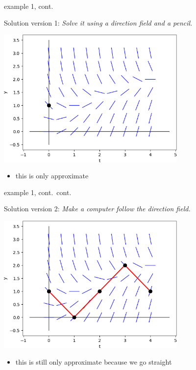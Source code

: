 \documentclass{beamer}
\begin{document}
\begin{frame}{example 1, cont.}

Solution version 1: \emph{Solve it using a direction field and a pencil.}

\bigskip
\hfill \includegraphics[width=0.7\textwidth]{figs/sequence-1}

\begin{itemize}
\item this is only approximate
\end{itemize}
\end{frame}


\begin{frame}{example 1, cont.~cont.}

Solution version 2: \emph{Make a computer follow the direction field.}

\bigskip
\hfill \includegraphics[width=0.7\textwidth]{figs/sequence-2}

\begin{itemize}
\item this is still only approximate because we go straight
\end{itemize}
\end{frame}
\end{document}
